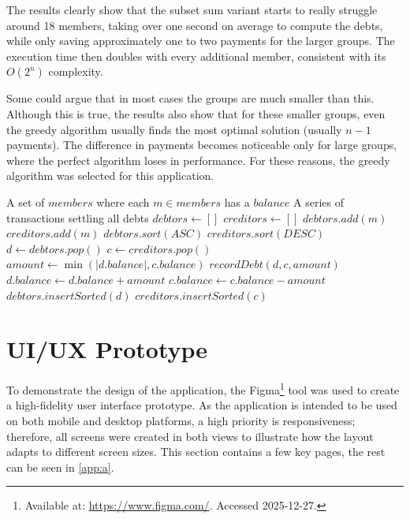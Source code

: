 \documentclass{ctuthesis}
\begin{document}
The results clearly show that the subset sum variant starts to really struggle around 18 members, taking over one second on average to compute the debts, while only saving approximately one to two payments for the larger groups. The execution time then doubles with every additional member, consistent with its $O(2^n)$ complexity.

Some could argue that in most cases the groups are much smaller than this. Although this is true, the results also show that for these smaller groups, even the greedy algorithm usually finds the most optimal solution (usually $n-1$ payments). The difference in payments becomes noticeable only for large groups, where the perfect algorithm loses in performance. For these reasons, the greedy algorithm was selected for this application.

\begin{algorithm}[h]
\caption{Greedy debt simplification algorithm pseudocode}
\label{alg:greedy}
\begin{algorithmic}
\Require A set of $members$ where each $m \in members$ has a $balance$
\Ensure A series of transactions settling all debts
\State $debtors \gets []$
\State $creditors \gets []$
        \State $debtors.add(m)$
        \State $creditors.add(m)$
    \EndIf
\EndFor
\State
\State $debtors.sort(ASC)$
\State $creditors.sort(DESC)$
\State
{}
    \State $d \gets debtors.pop()$
    \State $c \gets creditors.pop()$
    \State
    \State $amount \gets \min(|d.balance|, c.balance)$
    \State $recordDebt(d, c, amount)$
    \State
    \State $d.balance \gets d.balance + amount$
    \State $c.balance \gets c.balance - amount$
    \State
        \State $debtors.insertSorted(d)$
    \EndIf
        \State $creditors.insertSorted(c)$
    \EndIf
\EndWhile
\end{algorithmic}
\end{algorithm}

\section{UI/UX Prototype}
To demonstrate the design of the application, the Figma\footnote{Available at: \url{https://www.figma.com/}. Accessed 2025-12-27.} tool     was used to create a high-fidelity user interface prototype. As the application is intended to be used on both mobile and desktop platforms, a high priority is responsiveness; therefore, all screens were created in both views to illustrate how the layout adapts to different screen sizes. This section contains a few key pages, the rest can be seen in \autoref{app:a}.
\end{document}
